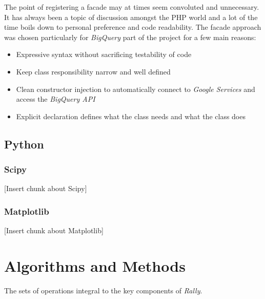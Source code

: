 \documentclass[msc,oneside]{ubcthesis}%
\begin{document}
The point of registering a facade may at times seem convoluted and unnecessary. It has always been a topic of discussion amongst the PHP world and a lot of the time boils down to personal preference and code readability. The facade approach was chosen particularly for \textit{BigQuery} part of the project for a few main reasons:
\begin{itemize}
  \item Expressive syntax without sacrificing testability of code
  \item Keep class responsibility narrow and well defined
  \item Clean constructor injection to automatically connect to \textit{Google Services} and access the \textit{BigQuery API}
  \item Explicit declaration defines what the class needs and what the class does
\end{itemize}

\section{Python}
\subsection{Scipy}
[Insert chunk about Scipy]
\subsection{Matplotlib}
[Insert chunk about Matplotlib]

\chapter{Algorithms and Methods}
The sets of operations integral to the key components of \textit{Rally}.
\end{document}
